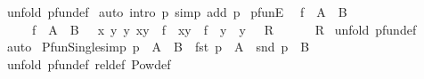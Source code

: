 \begin{isabellebody}
%
\isadelimproof
%
\endisadelimproof
%
\isatagproof
{}\isamarkupfalse%
\ {\isacharparenleft}unfold\ pfun{\isacharunderscore}def{\isacharparenright}\isanewline
{}\isamarkupfalse%
\ {\isacharparenleft}auto\ intro{\isacharcolon}\ p{}\ simp\ add{\isacharcolon}\ p{}{\isacharparenright}\isanewline
{}\isamarkupfalse%
%
\endisatagproof
{\isafoldproof}%
%
\isadelimproof
\isanewline
%
\endisadelimproof
\isanewline
\isanewline
{}\isamarkupfalse%
\ pfunE{\isacharcolon}\ \isanewline
{\isachardoublequoteopen}{\isacharbrackleft}{\isacharbar}\ f\ {\isacharcolon}\ A\ {\isacharminus}{\isacharbar}{\isacharminus}{\isachargreater}\ B{\isacharsemicolon}\ \ \isanewline
\ \ \ \ {\isacharbrackleft}{\isacharbar}\ f\ {\isacharcolon}\ A\ {\isacharless}{\isacharminus}{\isacharminus}{\isachargreater}\ B{\isacharsemicolon}\ \ {\isacharbang}\ x\ y{}\ y{}{\isachardot}\ {\isacharparenleft}x{\isacharcomma}y{}{\isacharparenright}\ {\isacharcolon}\ f\ {\isacharampersand}\ {\isacharparenleft}x{\isacharcomma}y{}{\isacharparenright}\ {\isacharcolon}\ f\ {\isacharminus}{\isacharminus}{\isachargreater}\ y{}\ {\isacharequal}\ y{}\ {\isacharbar}{\isacharbrackright}\ {\isacharequal}{\isacharequal}{\isachargreater}\ R\ \ \isanewline
\ \ {\isacharbar}{\isacharbrackright}\ {\isacharequal}{\isacharequal}{\isachargreater}\ R{\isachardoublequoteclose}\isanewline
%
\isadelimproof
%
\endisadelimproof
%
\isatagproof
{}\isamarkupfalse%
\ {\isacharparenleft}unfold\ pfun{\isacharunderscore}def{\isacharparenright}\isanewline
{}\isamarkupfalse%
\ auto\isanewline
{}\isamarkupfalse%
%
\endisatagproof
{\isafoldproof}%
%
\isadelimproof
\isanewline
%
\endisadelimproof
\isanewline
{}\isamarkupfalse%
\ Pfun{\isacharunderscore}Single{\isacharbrackleft}simp{\isacharbrackright}{\isacharcolon}\ {\isachardoublequoteopen}{\isacharbraceleft}p{\isacharbraceright}\ {\isacharcolon}\ {\isacharparenleft}A\ {\isacharminus}{\isacharbar}{\isacharminus}{\isachargreater}\ B{\isacharparenright}\ {\isacharequal}\ {\isacharparenleft}fst\ p\ {\isacharcolon}\ A\ {\isacharampersand}\ snd\ p\ {\isacharcolon}\ B{\isacharparenright}{\isachardoublequoteclose}\isanewline
%
\isadelimproof
%
\endisadelimproof
%
\isatagproof
{}\isamarkupfalse%
\ {\isacharparenleft}unfold\ pfun{\isacharunderscore}def\ rel{\isacharunderscore}def\ Pow{\isacharunderscore}def{\isacharparenright}\isanewline
{}\isamarkupfalse%

\end{isabellebody}
